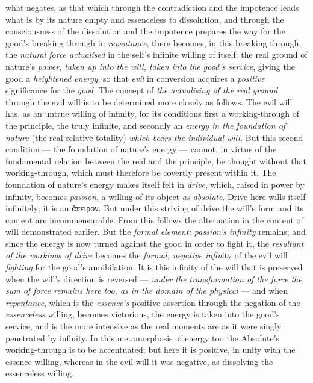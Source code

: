\documentclass[12pt,a4paper]{book}
\begin{document}
what negates, as that which through the contradiction and the impotence leads
what is by its nature empty and essenceless to dissolution, and through the
consciousness of the dissolution and the impotence prepares the way for the
good's breaking through in \emph{repentance}, there becomes, in this breaking
through, the \emph{natural force actualised} in the self's infinite willing of
itself: the real ground of nature's \emph{power, taken up into the will, taken
into the good's service}, giving the good a \emph{heightened energy}, so that
\emph{evil} in conversion acquires a \emph{positive} significance for the
\emph{good.}
The concept of \emph{the actualising of the real ground} through the evil will
is to be determined more closely as follows. The evil will has, as an untrue
willing of infinity, for its conditions first a working-through of the
principle, the truly infinite, and secondly an \emph{energy in the foundation of
nature} (the real relative totality) \emph{which bears the individual will.} But
this second condition --- the foundation of nature's energy --- cannot, in
virtue of the fundamental relation between the real and the principle, be
thought without that working-through, which must therefore be covertly present
within it. The foundation of nature's energy makes itself felt in \emph{drive},
which, raised in power by infinity, becomes \emph{passion}, a willing of its
object \emph{as absolute}. Drive here wills itself infinitely; it is an
ἄπειρον. But under this striving of drive the will's form and its content are
incommensurable. From this follows the alternation in the content of will
demonstrated earlier. But the \emph{formal element: passion's infinity} remains;
and since the energy is now turned against the good in order to fight it, the
\emph{resultant of the workings of drive} becomes the \emph{formal, negative
infin}ity of the evil will \emph{fighting} for the good's annihilation. It is
this infinity of the will that is preserved when the will's direction is
reversed --- \emph{under the transformation of the force the sum of force
remains here too, as in the domain of the physical} --- and when
\emph{repentance}, which is the \emph{essence's} positive assertion through the
negation of the \emph{essenceless} willing, becomes victorious, the energy is
taken into the good's service, and is the more intensive as the real moments are
as it were singly penetrated by infinity. In this metamorphosis of energy too
the Absolute's working-through is to be accentuated; but here it is positive, in
unity with the essence-willing, whereas in the evil will it was negative, as
dissolving the essenceless willing.
\end{document}
